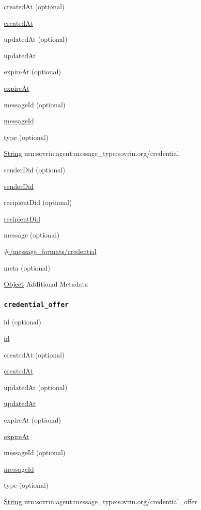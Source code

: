 createdAt (optional)

{\protect\hyperlink{createdAt}{createdAt}}

updatedAt (optional)

{\protect\hyperlink{updatedAt}{updatedAt}}

expireAt (optional)

{\protect\hyperlink{expireAt}{expireAt}}

messageId (optional)

{\protect\hyperlink{messageId}{messageId}}

type (optional)

{\protect\hyperlink{string}{String}}
urn:sovrin:agent:message\_type:sovrin.org/credential

senderDid (optional)

{\protect\hyperlink{senderDid}{senderDid}}

recipientDid (optional)

{\protect\hyperlink{recipientDid}{recipientDid}}

message (optional)

{\protect\hyperlink{ux5cux23ux2fmessage_formatsux2fcredential}{\#/message\_formats/credential}}

meta (optional)

{\protect\hyperlink{object}{Object}} Additional Metadata

\hypertarget{credential_offer}{%
\subsubsection{\texorpdfstring{\protect\hypertarget{credential_offer}{}{\texttt{credential\_offer}}}{credential\_offer}}\label{credential_offer}}

id (optional)

{\protect\hyperlink{id}{id}}

createdAt (optional)

{\protect\hyperlink{createdAt}{createdAt}}

updatedAt (optional)

{\protect\hyperlink{updatedAt}{updatedAt}}

expireAt (optional)

{\protect\hyperlink{expireAt}{expireAt}}

messageId (optional)

{\protect\hyperlink{messageId}{messageId}}

type (optional)

{\protect\hyperlink{string}{String}}
urn:sovrin:agent:message\_type:sovrin.org/credential\_offer

